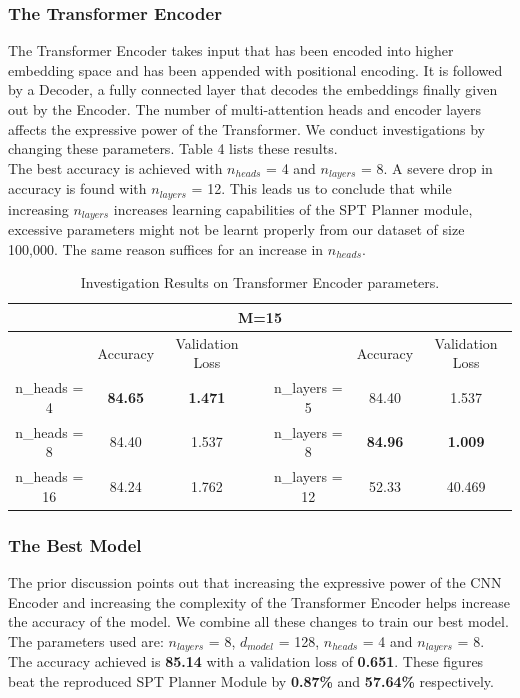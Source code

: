 \subsubsection{The Transformer Encoder}
The Transformer Encoder takes input that has been encoded into higher embedding space and has been appended with positional encoding. It is followed by a Decoder, a fully connected layer that decodes the embeddings finally given out by the Encoder. The number of multi-attention heads and encoder layers affects the expressive power of the Transformer. We conduct investigations by changing these parameters. Table 4 lists these results.\\ 
The best accuracy is achieved with $n_{heads}$ = 4 and $n_{layers}$ = 8. A severe drop in accuracy is found with $n_{layers}$ = 12. This leads us to conclude that while increasing $n_{layers}$ increases learning capabilities of the SPT Planner module, excessive parameters might not be learnt properly from our dataset of size 100,000. The same reason suffices for an increase in $n_{heads}$.
\begin{table}[]
\begin{center}
\begin{tabular}{@{}ccccccc@{}}
\toprule
\multicolumn{7}{c}{M=15}                                                                                \\ \midrule
              & Accuracy       & Validation Loss &  &                & Accuracy       & Validation Loss \\ \cmidrule(r){1-3} \cmidrule(l){5-7} 
n\_heads = 4  & \textbf{84.65} & \textbf{1.471}  &  & n\_layers = 5  & 84.40          & 1.537           \\
n\_heads = 8  & 84.40          & 1.537           &  & n\_layers = 8  & \textbf{84.96} & \textbf{1.009}  \\
n\_heads = 16 & 84.24          & 1.762           &  & n\_layers = 12 & 52.33          & 40.469          \\ \bottomrule
\end{tabular}
\end{center}
\caption{Investigation Results on Transformer Encoder parameters.}
\end{table}

\subsubsection{The Best Model}
The prior discussion points out that increasing the expressive power of the CNN Encoder and increasing the complexity of the Transformer Encoder helps increase the accuracy of the model. We combine all these changes to train our best model. \\  
The parameters used are: $n_{layers}$ = 8, $d_{model}$ = 128, $n_{heads}$ = 4 and $n_{layers}$ = 8. The accuracy achieved is \textbf{85.14} with a validation loss of\textbf{ 0.651}. These figures beat the reproduced SPT Planner Module by \textbf{0.87\%} and \textbf{57.64\%} respectively. 

